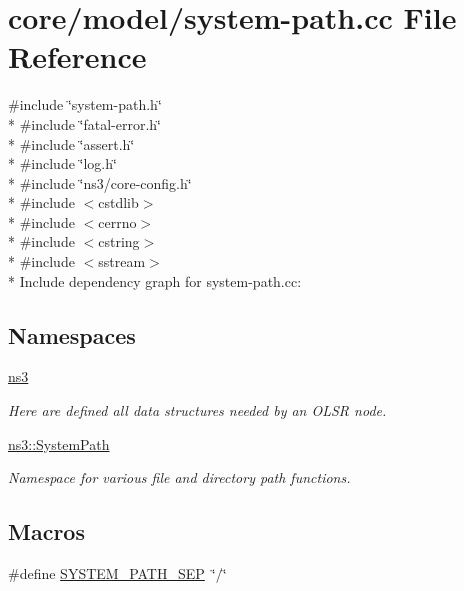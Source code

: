 \hypertarget{system-path_8cc}{}\section{core/model/system-\/path.cc File Reference}
\label{system-path_8cc}
{\ttfamily \#include \char`\"{}system-\/path.\+h\char`\"{}}\\*
{\ttfamily \#include \char`\"{}fatal-\/error.\+h\char`\"{}}\\*
{\ttfamily \#include \char`\"{}assert.\+h\char`\"{}}\\*
{\ttfamily \#include \char`\"{}log.\+h\char`\"{}}\\*
{\ttfamily \#include \char`\"{}ns3/core-\/config.\+h\char`\"{}}\\*
{\ttfamily \#include $<$cstdlib$>$}\\*
{\ttfamily \#include $<$cerrno$>$}\\*
{\ttfamily \#include $<$cstring$>$}\\*
{\ttfamily \#include $<$sstream$>$}\\*
Include dependency graph for system-\/path.cc\+:
\subsection*{Namespaces}
\begin{DoxyCompactItemize}
\item 
 \hyperlink{namespacens3}{ns3}
\begin{DoxyCompactList}\small\item\em Here are defined all data structures needed by an O\+L\+SR node. \end{DoxyCompactList}\item 
 \hyperlink{namespacens3_1_1SystemPath}{ns3\+::\+System\+Path}
\begin{DoxyCompactList}\small\item\em Namespace for various file and directory path functions. \end{DoxyCompactList}\end{DoxyCompactItemize}
\subsection*{Macros}
\begin{DoxyCompactItemize}
\item 
\#define \hyperlink{system-path_8cc_ae6764c655849cd2f06e112ac5222a99c}{S\+Y\+S\+T\+E\+M\+\_\+\+P\+A\+T\+H\+\_\+\+S\+EP}~\char`\"{}/\char`\"{}
\end{DoxyCompactItemize}
